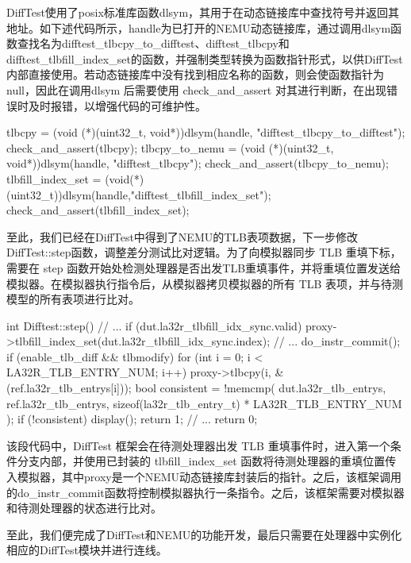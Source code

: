DiffTest使用了posix标准库函数dlsym，其用于在动态链接库中查找符号并返回其地址。如下述代码所示，handle为已打开的NEMU动态链接库，通过调用dlsym函数查找名为difftest\_tlbcpy\_to\_difftest、difftest\_tlbcpy和difftest\_tlbfill\_index\_set的函数，并强制类型转换为函数指针形式，以供DiffTest内部直接使用。若动态链接库中没有找到相应名称的函数，则会使函数指针为null，因此在调用dlsym 后需要使用 check\_and\_assert 对其进行判断，在出现错误时及时报错，以增强代码的可维护性。

\begin{CodeBlock}[language=BookCpp]
tlbcpy = (void (*)(uint32_t, void*))dlsym(handle, "difftest_tlbcpy_to_difftest");
check_and_assert(tlbcpy);
tlbcpy_to_nemu = (void (*)(uint32_t, void*))dlsym(handle, "difftest_tlbcpy");
check_and_assert(tlbcpy_to_nemu);
tlbfill_index_set = (void(*)(uint32_t))dlsym(handle,"difftest_tlbfill_index_set");
check_and_assert(tlbfill_index_set);
\end{CodeBlock}

至此，我们已经在DiffTest中得到了NEMU的TLB表项数据，下一步修改DiffTest::step函数，调整差分测试比对逻辑。为了向模拟器同步 TLB 重填下标，需要在 step 函数开始处检测处理器是否出发TLB重填事件，并将重填位置发送给模拟器。在模拟器执行指令后，从模拟器拷贝模拟器的所有 TLB 表项，并与待测模型的所有表项进行比对。

\begin{CodeBlock}[language=BookCpp]
int Difftest::step() {
  // ...
  if (dut.la32r_tlbfill_idx_sync.valid) {
    proxy->tlbfill_index_set(dut.la32r_tlbfill_idx_sync.index);
  }
  // ...
  do_instr_commit();
  if (enable_tlb_diff && tlbmodify) {
    for (int i = 0; i < LA32R_TLB_ENTRY_NUM; i++) {
      proxy->tlbcpy(i, &(ref.la32r_tlb_entrys[i]));
    }
    bool consistent = !memcmp(
      dut.la32r_tlb_entrys, ref.la32r_tlb_entrys,
      sizeof(la32r_tlb_entry_t) * LA32R_TLB_ENTRY_NUM
    );
    if (!consistent) {
      display();
      return 1;
    }
  }
  // ...
  return 0;
}
\end{CodeBlock}

该段代码中，DiffTest 框架会在待测处理器出发 TLB 重填事件时，进入第一个条件分支内部，并使用已封装的 tlbfill\_index\_set 函数将待测处理器的重填位置传入模拟器，其中proxy是一个NEMU动态链接库封装后的指针。之后，该框架调用的do\_instr\_commit函数将控制模拟器执行一条指令。之后，该框架需要对模拟器和待测处理器的状态进行比对。

至此，我们便完成了DiffTest和NEMU的功能开发，最后只需要在处理器中实例化相应的DiffTest模块并进行连线。


